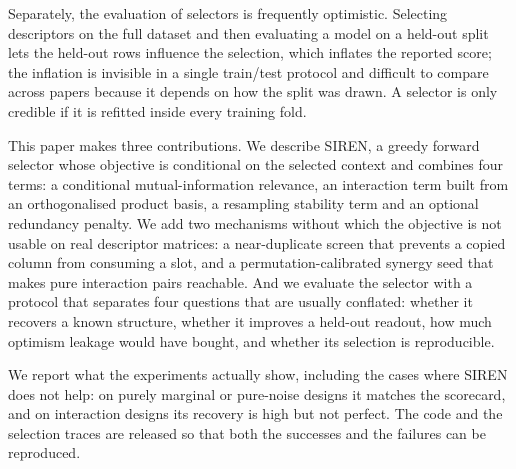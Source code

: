 Separately, the evaluation of selectors is frequently optimistic. Selecting
descriptors on the full dataset and then evaluating a model on a held-out split
lets the held-out rows influence the selection, which inflates the reported
score; the inflation is invisible in a single train/test protocol and difficult
to compare across papers because it depends on how the split was drawn. A
selector is only credible if it is refitted inside every training fold.

This paper makes three contributions. We describe SIREN, a greedy forward
selector whose objective is conditional on the selected context and combines
four terms: a conditional mutual-information relevance, an interaction term
built from an orthogonalised product basis, a resampling stability term and an
optional redundancy penalty. We add two mechanisms without which the objective
is not usable on real descriptor matrices: a near-duplicate screen that prevents
a copied column from consuming a slot, and a permutation-calibrated synergy seed
that makes pure interaction pairs reachable. And we evaluate the selector with a
protocol that separates four questions that are usually conflated: whether it
recovers a known structure, whether it improves a held-out readout, how much
optimism leakage would have bought, and whether its selection is reproducible.

We report what the experiments actually show, including the cases where SIREN does
not help: on purely marginal or pure-noise designs it matches the scorecard, and
on interaction designs its recovery is high but not perfect. The code and the
selection traces are released so that both the successes and the failures can be
reproduced.
